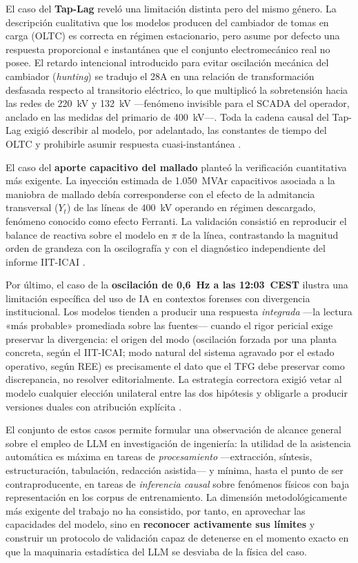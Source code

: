 El caso del \textbf{Tap-Lag} reveló una limitación distinta pero del mismo
género. La descripción cualitativa que los modelos producen del cambiador de
tomas en carga (OLTC) es correcta en régimen estacionario, pero asume por
defecto una respuesta proporcional e instantánea que el conjunto
electromecánico real no posee. El retardo intencional introducido para evitar
oscilación mecánica del cambiador (\textit{hunting}) se tradujo el 28A en una
relación de transformación desfasada respecto al transitorio eléctrico, lo que
multiplicó la sobretensión hacia las redes de 220~kV y 132~kV
---fenómeno invisible para el SCADA del operador, anclado en las medidas del
primario de 400~kV---. Toda la cadena causal del Tap-Lag exigió describir al
modelo, por adelantado, las constantes de tiempo del OLTC y prohibirle asumir
respuesta cuasi-instantánea \cite{ree2025, gobierno2025}.

El caso del \textbf{aporte capacitivo del mallado} planteó la verificación
cuantitativa más exigente. La inyección estimada de 1.050~MVAr capacitivos
asociada a la maniobra de mallado debía corresponderse con el efecto de la
admitancia transversal ($Y_t$) de las líneas de 400~kV operando en régimen
descargado, fenómeno conocido como efecto Ferranti. La validación consistió
en reproducir el balance de reactiva sobre el modelo en $\pi$ de la línea,
contrastando la magnitud orden de grandeza con la oscilografía y con el
diagnóstico independiente del informe IIT-ICAI \cite{icai2025}.

Por último, el caso de la \textbf{oscilación de 0,6~Hz a las 12:03~CEST}
ilustra una limitación específica del uso de IA en contextos forenses con
divergencia institucional. Los modelos tienden a producir una respuesta
\textit{integrada} ---la lectura «más probable» promediada sobre las
fuentes--- cuando el rigor pericial exige preservar la divergencia: el origen
del modo (oscilación forzada por una planta concreta, según el IIT-ICAI;
modo natural del sistema agravado por el estado operativo, según REE) es
precisamente el dato que el TFG debe preservar como discrepancia, no resolver
editorialmente. La estrategia correctora exigió vetar al modelo cualquier
elección unilateral entre las dos hipótesis y obligarle a producir versiones
duales con atribución explícita \cite{icai2025, ree2025}.

El conjunto de estos casos permite formular una observación de alcance general
sobre el empleo de LLM en investigación de ingeniería: la utilidad de la
asistencia automática es máxima en tareas de \textit{procesamiento}
---extracción, síntesis, estructuración, tabulación, redacción asistida---
y mínima, hasta el punto de ser contraproducente, en tareas de
\textit{inferencia causal} sobre fenómenos físicos con baja representación en
los corpus de entrenamiento. La dimensión metodológicamente más exigente del
trabajo no ha consistido, por tanto, en aprovechar las capacidades del modelo,
sino en \textbf{reconocer activamente sus límites} y construir un protocolo de
validación capaz de detenerse en el momento exacto en que la maquinaria
estadística del LLM se desviaba de la física del caso.

